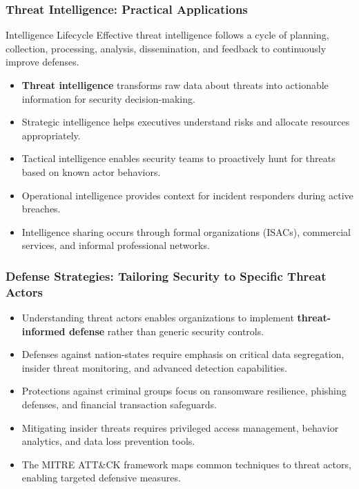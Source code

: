 \documentclass{beamer}
\begin{document}
\begin{frame}
    \frametitle{Threat Intelligence: Practical Applications}
    
    \begin{alertblock}{Intelligence Lifecycle}
        Effective threat intelligence follows a cycle of planning, collection, processing, analysis, dissemination, and feedback to continuously improve defenses.
    \end{alertblock}
    
    \begin{itemize}
        \item \textbf{Threat intelligence} transforms raw data about threats into actionable information for security decision-making.
        \item Strategic intelligence helps executives understand risks and allocate resources appropriately.
        \item Tactical intelligence enables security teams to proactively hunt for threats based on known actor behaviors.
        \item Operational intelligence provides context for incident responders during active breaches.
        \item Intelligence sharing occurs through formal organizations (ISACs), commercial services, and informal professional networks.
    \end{itemize}
\end{frame}

\begin{frame}
    \frametitle{Defense Strategies: Tailoring Security to Specific Threat Actors}
    
    \begin{itemize}
        \item Understanding threat actors enables organizations to implement \textbf{threat-informed defense} rather than generic security controls.
        \item Defenses against nation-states require emphasis on critical data segregation, insider threat monitoring, and advanced detection capabilities.
        \item Protections against criminal groups focus on ransomware resilience, phishing defenses, and financial transaction safeguards.
        \item Mitigating insider threats requires privileged access management, behavior analytics, and data loss prevention tools.
        \item The MITRE ATT\&CK framework maps common techniques to threat actors, enabling targeted defensive measures.
    \end{itemize}
\end{frame}
\end{document}
